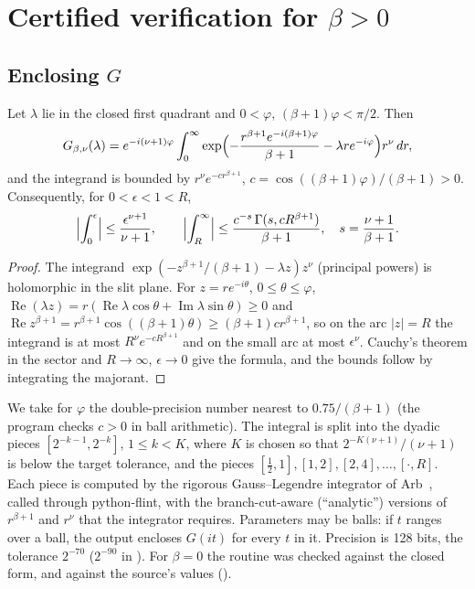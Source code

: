 \documentclass[11pt,a4paper]{report}
\begin{document}
\section{Certified verification for \texorpdfstring{$\beta>0$}{beta>0}}\label{sec:certified}

\subsection{Enclosing \texorpdfstring{$G$}{G}}
\begin{lemma}\label{lem:ray}
Let $\lambda$ lie in the closed first quadrant and $0<\varphi$, $(\beta+1)\varphi<\pi/2$. Then
\[
G_{\beta,\nu}(\lambda)=e^{-i(\nu+1)\varphi}\int_0^\infty \exp\Bigl(-\frac{r^{\beta+1}e^{-i(\beta+1)\varphi}}{\beta+1}-\lambda re^{-i\varphi}\Bigr)r^\nu\,dr,
\]
and the integrand is bounded by $r^\nu e^{-cr^{\beta+1}}$, $c=\cos((\beta+1)\varphi)/(\beta+1)>0$. Consequently, for $0<\epsilon<1<R$,
\[
\Bigl|\int_0^\epsilon\Bigr|\le\frac{\epsilon^{\nu+1}}{\nu+1},\qquad
\Bigl|\int_R^\infty\Bigr|\le\frac{c^{-s}\,\Gamma(s,cR^{\beta+1})}{\beta+1},\quad s=\frac{\nu+1}{\beta+1}.
\]
\end{lemma}
\begin{proof}
The integrand $\exp(-z^{\beta+1}/(\beta+1)-\lambda z)z^\nu$ (principal powers) is holomorphic in the slit plane. For $z=re^{-i\theta}$, $0\le\theta\le\varphi$, $\operatorname{Re}(\lambda z)=r(\operatorname{Re}\lambda\cos\theta+\operatorname{Im}\lambda\sin\theta)\ge0$ and $\operatorname{Re}z^{\beta+1}=r^{\beta+1}\cos((\beta+1)\theta)\ge(\beta+1)cr^{\beta+1}$, so on the arc $|z|=R$ the integrand is at most $R^\nu e^{-cR^{\beta+1}}$ and on the small arc at most $\epsilon^\nu$. Cauchy's theorem in the sector and $R\to\infty$, $\epsilon\to0$ give the formula, and the bounds follow by integrating the majorant.
\end{proof}

We take for $\varphi$ the double-precision number nearest to $0.75/(\beta+1)$ (the program checks $c>0$ in ball arithmetic). The integral is split into the dyadic pieces $[2^{-k-1},2^{-k}]$, $1\le k<K$, where $K$ is chosen so that $2^{-K(\nu+1)}/(\nu+1)$ is below the target tolerance, and the pieces $[\frac12,1],[1,2],[2,4],\dots,[\cdot,R]$. Each piece is computed by the rigorous Gauss--Legendre integrator of Arb~\autocite{Johansson2017,Johansson2018}, called through python-flint, with the branch-cut-aware (``analytic'') versions of $r^{\beta+1}$ and $r^\nu$ that the integrator requires. Parameters may be balls: if $t$ ranges over a ball, the output encloses $G(it)$ for every $t$ in it. Precision is 128 bits, the tolerance $2^{-70}$ ($2^{-90}$ in ). For $\beta=0$ the routine was checked against the closed form, and against the source's values ().
\end{document}
